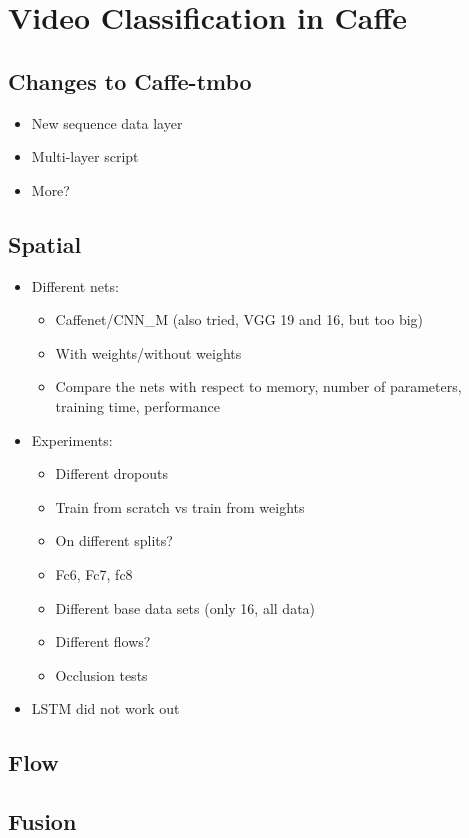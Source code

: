 \section{Video Classification in Caffe}
\label{sec:classification}

\subsection{Changes to Caffe-tmbo}

\begin{itemize}
	\item New sequence data layer
	\item Multi-layer script
	\item More?
\end{itemize}

\subsection{Spatial}

\begin{itemize}
	\item
		Different nets:
		\begin{itemize}
			\item Caffenet/CNN\_M (also tried, VGG 19 and 16, but too big)
			\item With weights/without weights
			\item Compare the nets with respect to memory, number of parameters, training time, performance
		\end{itemize}
	\item
		Experiments:
		\begin{itemize}
			\item Different dropouts
			\item Train from scratch vs train from weights
			\item On different splits?
			\item Fc6, Fc7, fc8
			\item Different base data sets (only 16, all data)
			\item Different flows?
			\item Occlusion tests
		\end{itemize}
	\item
		LSTM did not work out
\end{itemize}


\subsection{Flow}
\subsection{Fusion}